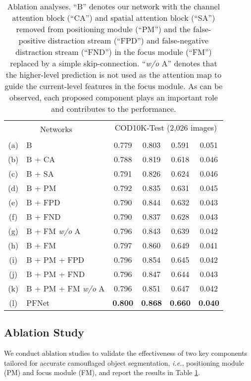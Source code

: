 \documentclass[final]{cvpr}
\begin{document}
\begin{table}[t]
	\centering
	\footnotesize
\setlength{\tabcolsep}{6.5pt}
	\begin{tabular}{cl|cccc}
		\hline
		\multicolumn{2}{c|}{\multirow{2}{*}{Networks}} & \multicolumn{4}{c}{COD10K-Test (2,026 images)} \\
\cline{3-6}
		& &  &  &  &  \\
		
		\hline
(a) & B & 0.779 & 0.803 & 0.591 & 0.051 \\
		\hline
		(b) & B + CA & 0.788 & 0.819 & 0.618 & 0.046 \\
		(c) & B + SA & 0.791 & 0.826 & 0.624 & 0.046 \\
		(d) & B + PM & 0.792 & 0.835 & 0.631 & 0.045 \\
		\hline
		(e) & B + FPD & 0.790 & 0.844 & 0.632 & 0.043 \\
		(f) & B + FND & 0.790 & 0.837 & 0.628 & 0.043 \\
		(g) & B + FM \textit{w/o} A & 0.796 & 0.843 & 0.639 & 0.042 \\
		(h) & B + FM & 0.797 & 0.860 & 0.649 & 0.041 \\
		\hline
		(i) & B + PM + FPD & 0.796 & 0.854 & 0.645 & 0.042 \\
		(j) & B + PM + FND & 0.796 & 0.847 & 0.644 & 0.043 \\
		(k) & B + PM + FM \textit{w/o} A & 0.796 & 0.851 & 0.647 & 0.042 \\
		
\hline
		(l) & PFNet & \textbf{0.800} & \textbf{0.868} & \textbf{0.660} & \textbf{0.040}     \\
		\hline
	\end{tabular}
	\caption{Ablation analyses. ``B'' denotes our network with the channel attention block (``CA'') and spatial attention block (``SA'') removed from positioning module (``PM'') and the false-positive distraction stream (``FPD'') and false-negative distraction stream (``FND'') in the focus module (``FM'') replaced by a simple skip-connection. ``\textit{w/o} A'' denotes that the higher-level prediction is not used as the attention map to guide the current-level features in the focus module. As can be observed, each proposed component plays an important role and contributes to the performance.}
	\label{tab:ablation}
\end{table}



\subsection{Ablation Study}
We conduct ablation studies to validate the effectiveness of two key components tailored for accurate camouflaged object segmentation, \emph{i.e.}, positioning module (PM) and focus module (FM), and report the results in Table \ref{tab:ablation}.
\end{document}
